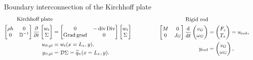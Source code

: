 \documentclass[aspectratio=169]{ISAE-Beamer}
\DeclareMathOperator*{\grad}{grad}
\DeclareMathOperator*{\Grad}{Grad}
\DeclareMathOperator*{\Div}{Div}
\renewcommand{\div}{\operatorname{div}}
\begin{document}
\begin{frame}{Boundary interconnection of the Kirchhoff plate}
\begin{equation*}\small
\begin{aligned}
\text{Kirchhoff plate} \\
\begin{bmatrix}
\rho h & 0 \\ 0 & \mathbb{D}^{-1} \\
\end{bmatrix}
\diffp{}{t}
\begin{bmatrix}
w_t \\ \Sigma \\
\end{bmatrix} &= 
\begin{bmatrix}
0 & -\div\Div \\ \Grad\grad & 0 \\
\end{bmatrix}
\begin{bmatrix}
w_t \\ \Sigma \\
\end{bmatrix} \\
u_{\partial, \text{pl}} &= w_t(x = L_x, y), \\
y_{\partial, \text{pl}} &= \mathcal{D} \Sigma = \widetilde{q}_n(x = L_x, y).
\end{aligned} \qquad \qquad
\begin{aligned}
\text{Rigid rod} \\
\begin{bmatrix}
M & 0 \\
0   & J_G \\
\end{bmatrix} 
\displaystyle \diff{}{t}
\begin{pmatrix}
v_G \\ \omega_G \\
\end{pmatrix} & = \begin{pmatrix}
F_z \\ T_x \\
\end{pmatrix} = {u}_{\text{rod}}\vspace{1mm}, \\
{y}_{\text{rod}} &= \begin{pmatrix}
v_G \\ \omega_{G} \\
\end{pmatrix},
\end{aligned}

\end{equation*}
\end{frame}
\end{document}
